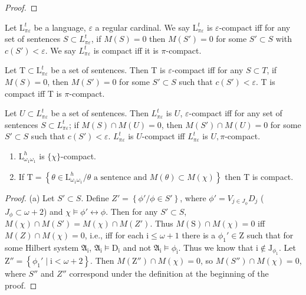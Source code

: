 \documentclass{article}
\begin{document}
{{{\begin{proof}
\end{proof}
\begin{definition}
Let $\mathrm{L}_{\pi \varepsilon}^{t}$ be a language, $\varepsilon$ a regular cardinal. We say $\mathrm{L}_{\pi \varepsilon}^{t}$ is $\varepsilon$-compact iff for any set of sentences $S \subset L_{\pi \varepsilon}^{t}$, if $M(S)=0$ then $M\left(S'\right)=0$ for some $S' \subset S$ with $c\left(S'\right)<\varepsilon$. We say $L_{\pi \varepsilon}^{t}$ is compact iff it is $\pi$-compact.
\end{definition}
\begin{definition}
Let $\mathrm{T} \subset \mathrm{L}_{\pi \varepsilon}^{t}$ be a set of sentences. Then T is $\varepsilon$-compact iff for any $S \subset T$, if $M(S)=0$, then $M\left(S'\right)=0$ for some $S' \subset S$ such that $c\left(S'\right)<\varepsilon$. T is compact iff T is $\pi$-compact.
\end{definition}
\begin{definition}
Let $U \subset L_{\pi \varepsilon}^{t}$ be a set of sentences. Then $L_{\pi \varepsilon}^{t}$ is $U$, $\varepsilon$-compact iff for any set of sentences $S \subset L_{\pi \varepsilon}^{t}$; if $M(S) \cap M(U)=0$, then $M\left(S'\right) \cap M(U)=0$ for some $S' \subset S$ such that $c\left(S'\right)<\varepsilon$. $L_{\pi \varepsilon}^{t}$ is $U$-compact iff $L_{\pi \varepsilon}^{t}$ is $U, \pi$-compact.
\end{definition}
\begin{theorem}
\begin{enumerate}
\item $\mathrm{L}_{\omega_{1} \omega_{1}}^{h}$ is $\{\chi\}$-compact.
\item If $\mathrm{T}=\left\{\theta \in \mathrm{L}_{\omega_{1} \omega_{1}}^{h} / \theta \text{ a sentence and } M(\theta) \subset M(\chi)\right\}$ then T is compact.
\end{enumerate}
\end{theorem}
\begin{proof}
(a) Let $S' \subset S$. Define $Z'=\left\{\phi' / \phi \in S'\right\}$, where $\phi'=V_{j \in J_{\phi}} D_{j}$ ($J_{\phi} \subset \omega+2$) and $\chi \vDash \phi' \leftrightarrow \phi$. Then for any $S' \subset S$, $M(\chi) \cap M\left(S'\right)=M(\chi) \cap M\left(Z'\right)$. Thus $M(\mathrm{S}) \cap M(\chi)=0$ iff $M(Z) \cap M(\chi)=0$, i.e., iff for each $\mathrm{i} \leq \omega+1$ there is a $\phi_{1}' \in \mathrm{Z}$ such that for some Hilbert system $\mathfrak{A}_{\mathrm{i}}$, $\mathfrak{A}_{\mathrm{i}} \vDash \mathrm{D}_{\mathrm{i}}$ and not $\mathfrak{A}_{\mathrm{i}} \vDash \phi_{\mathrm{i}}$. Thus we know that $\mathrm{i} \notin \mathrm{J}_{\phi_{1}}$. Let $\mathrm{Z}''=\left\{\phi_{1}' \mid \mathrm{i}<\omega+2\right\}$. Then $M\left(\mathrm{Z}''\right) \cap M(\chi)=0$, so $M\left(S''\right) \cap M(\chi)=0$, where $S''$ and $Z''$ correspond under the definition at the beginning of the proof.

\end{proof}}}}
\end{document}
